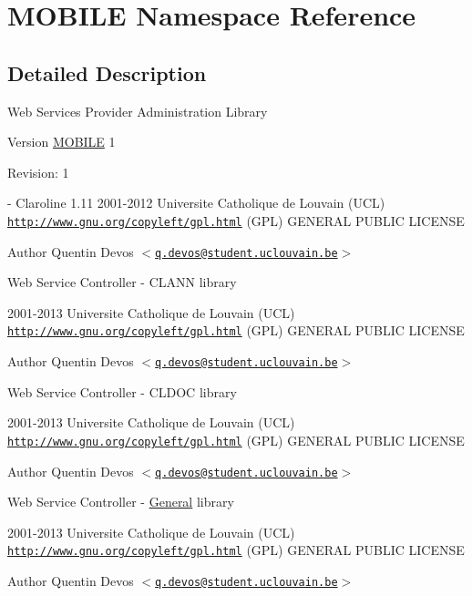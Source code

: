 \hypertarget{namespace_m_o_b_i_l_e}{
\section{MOBILE Namespace Reference}
\label{namespace_m_o_b_i_l_e}
}


\subsection{Detailed Description}
Web Services Provider Administration Library

\begin{DoxyVersion}{Version}
\hyperlink{namespace_m_o_b_i_l_e}{MOBILE} 1 
\end{DoxyVersion}
\begin{DoxyParagraph}{Revision:}
1 
\end{DoxyParagraph}
-\/ Claroline 1.11  2001-\/2012 Universite Catholique de Louvain (UCL)  \href{http://www.gnu.org/copyleft/gpl.html}{\tt http://www.gnu.org/copyleft/gpl.html} (GPL) GENERAL PUBLIC LICENSE

\begin{DoxyAuthor}{Author}
Quentin Devos $<$\href{mailto:q.devos@student.uclouvain.be}{\tt q.devos@student.uclouvain.be}$>$
\end{DoxyAuthor}
Web Service Controller -\/ CLANN library

2001-\/2013 Universite Catholique de Louvain (UCL)  \href{http://www.gnu.org/copyleft/gpl.html}{\tt http://www.gnu.org/copyleft/gpl.html} (GPL) GENERAL PUBLIC LICENSE

\begin{DoxyAuthor}{Author}
Quentin Devos $<$\href{mailto:q.devos@student.uclouvain.be}{\tt q.devos@student.uclouvain.be}$>$
\end{DoxyAuthor}
Web Service Controller -\/ CLDOC library

2001-\/2013 Universite Catholique de Louvain (UCL)  \href{http://www.gnu.org/copyleft/gpl.html}{\tt http://www.gnu.org/copyleft/gpl.html} (GPL) GENERAL PUBLIC LICENSE

\begin{DoxyAuthor}{Author}
Quentin Devos $<$\href{mailto:q.devos@student.uclouvain.be}{\tt q.devos@student.uclouvain.be}$>$
\end{DoxyAuthor}
Web Service Controller -\/ \hyperlink{class_general}{General} library

2001-\/2013 Universite Catholique de Louvain (UCL)  \href{http://www.gnu.org/copyleft/gpl.html}{\tt http://www.gnu.org/copyleft/gpl.html} (GPL) GENERAL PUBLIC LICENSE

\begin{DoxyAuthor}{Author}
Quentin Devos $<$\href{mailto:q.devos@student.uclouvain.be}{\tt q.devos@student.uclouvain.be}$>$ 
\end{DoxyAuthor}
